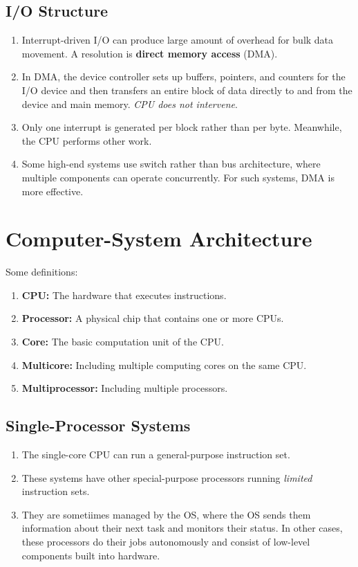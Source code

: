 \documentclass[journal,12pt,twocolumn]{IEEEtran}
\begin{document}
\subsection{I/O Structure}
\begin{enumerate}
  \item Interrupt-driven I/O can produce large amount of overhead for bulk data 
  movement. A resolution is \textbf{direct memory access} (DMA).
  \item In DMA, the device controller sets up buffers, pointers, and counters
  for the I/O device and then transfers an entire block of data directly to and 
  from the device and main memory. \textit{CPU does not intervene}.
  \item Only one interrupt is generated per block rather than per byte. 
  Meanwhile, the CPU performs other work.
  \item Some high-end systems use switch rather than bus architecture, where 
  multiple components can operate concurrently. For such systems, DMA is more 
  effective.
\end{enumerate}

\section{Computer-System Architecture}

Some definitions:
\begin{enumerate}
  \item \textbf{CPU:} The hardware that executes instructions.
  \item \textbf{Processor:} A physical chip that contains one or more CPUs.
  \item \textbf{Core:} The basic computation unit of the CPU.
  \item \textbf{Multicore:} Including multiple computing cores on the same CPU.
  \item \textbf{Multiprocessor:} Including multiple processors.
\end{enumerate}

\subsection{Single-Processor Systems}
\begin{enumerate}
  \item The single-core CPU can run a general-purpose instruction set.
  \item These systems have other special-purpose processors running 
  \textit{limited} instruction sets.
  \item They are sometiimes managed by the OS, where the OS sends them 
  information about their next task and monitors their status. In other cases, 
  these processors do their jobs autonomously and consist of low-level 
  components built into hardware.
\end{enumerate}
\end{document}
